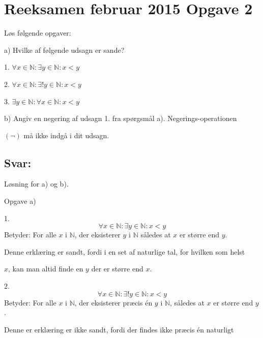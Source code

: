 \documentclass{article}
\begin{document}
 \section{Reeksamen februar 2015 Opgave 2}
 \vspace{10pt}
 Løs følgende opgaver: 
 \vspace{10pt}
 
a) Hvilke af følgende udsagn er sande? 
 \vspace{10pt}

1. $ \forall x \in \mathbb{N }: \exists y \in \mathbb{N}: x < y $  \vspace{10pt}
 
2. $ \forall x \in \mathbb{N }: \exists !y \in \mathbb{N}: x < y $ \vspace{10pt}

3. $\exists y \in \mathbb{N}: \forall x \in \mathbb{N}: x < y$
\vspace{10pt}


b) Angiv en negering af udsagn 1. fra spørgsmål a). Negerings-operationen 

$(\neg)$ må ikke indgå i dit udsagn. 
\vspace{11pt}

\subsection{Svar:}
\vspace{10pt}

Løsning for a) og b). 
\vspace{10pt}

Opgave a) 
 \vspace{10pt}
 
1. $$ \forall x \in \mathbb{N }: \exists y \in \mathbb{N}: x < y $$
Betyder: For alle $x$ i $\mathbb{N}$, der eksisterer $y$ i $\mathbb{N}$ således at $x$ er større end $y$.
\vspace{10pt}

Denne erklæring er sandt, fordi i en set af naturlige tal, for hvilken som helst

$x$, kan man altid finde en $y$ der er større end $x$. 
\vspace{10pt}

2. $$\forall x \in \mathbb{N }: \exists !y \in \mathbb{N}: x < y$$
Betyder: For alle $x$ i $\mathbb{N}$, der eksisterer præcis én $y$ i $\mathbb{N}$, således at $x$ er større end $y$.
 \vspace{10pt} 

Denne er erklæring er ikke sandt, fordi der findes ikke præcis én naturligt 
\end{document}

